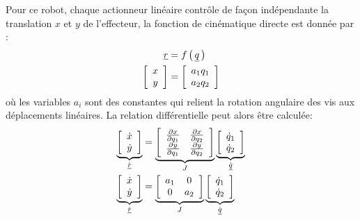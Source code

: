 Pour ce robot, chaque actionneur linéaire contrôle de façon indépendante la translation $x$ et $y$ de l'effecteur, la fonction de cinématique directe est donnée par :
\begin{align}
	\quad \underline{r} &= f\left( \, \underline{q} \, \right)  \\
	\left[ \begin{array}{c} x \\ y  \end{array} \right]  &= \left[ \begin{array}{c} a_1 q_1 \\ a_2 q_2  \end{array} \right]
	\label{eq:fwdkinlin}
\end{align}
où les variables $a_i$ sont des constantes qui relient la rotation angulaire des vis aux déplacements linéaires. La relation différentielle peut alors être calculée:
\begin{align}
	\underbrace{ \left[ \begin{array}{c} \dot{x} \\ \dot{y}  \end{array} \right] }_{\dot{\underline{r}}}
	&=
	\underbrace{ \left[ \begin{array}{c c }
							\frac{\partial x }{\partial q_1}   & \frac{\partial x }{\partial q_2} \\
							\frac{\partial y }{\partial q_1}   & \frac{\partial y }{\partial q_2}
	\end{array} \right]  }_{ J }
	\underbrace{ \left[ \begin{array}{c}
							\dot{q}_1 \\
							\dot{q}_2
	\end{array} \right]}_{ \dot{\underline{q}} } \\
	\underbrace{ \left[ \begin{array}{c} \dot{x} \\ \dot{y}  \end{array} \right] }_{\dot{\underline{r}}}
	&=
	\underbrace{ \left[ \begin{array}{c c }
							a_1 & 0 \\
							0   & a_2
	\end{array} \right]  }_{ J }
	\underbrace{ \left[ \begin{array}{c}
							\dot{q}_1 \\
							\dot{q}_2
	\end{array} \right]}_{ \dot{\underline{q}} } \\
\end{align}


